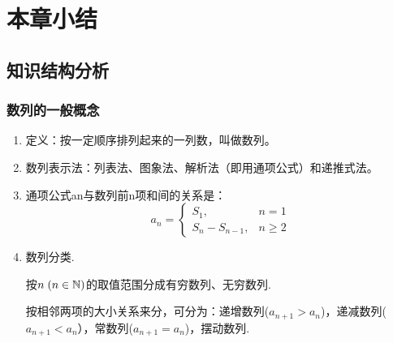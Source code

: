 \section{本章小结}

\subsection{知识结构分析}
\subsubsection{数列的一般概念}
\begin{enumerate}
\item 定义：按一定顺序排列起来的一列数，叫做数列。
\item 数列表示法：列表法、图象法、解析法（即用通项公式）和递推式法。
\item 通项公式an与数列前n项和间的关系是：
\[a_n=\begin{cases}
    S_1,&n=1\\
    S_n-S_{n-1},&n\ge 2
\end{cases}\]
\item 数列分类.

按$n\; (n\in\mathbb{N})$的取值范围分成有穷数列、无穷数列.

按相邻两项的大小关系来分，可分为：递增数列($a_{n+1}>a_n$)，递减数列($a_{n+1}<a_n$），常数列($a_{n+1}=a_n$)，摆动数列.
\end{enumerate}




